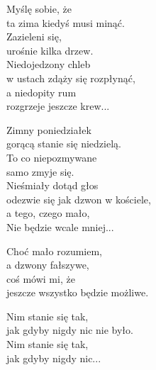 \begin{text}
    Myślę sobie, że\\
    ta zima kiedyś musi minąć.\\
    Zazieleni się,\\
    urośnie kilka drzew.\\
    Niedojedzony chleb\\
    w ustach zdąży się rozpłynąć,\\
    a niedopity rum\\
    rozgrzeje jeszcze krew...

    Zimny poniedziałek\\
    gorącą stanie się niedzielą.\\
    To co niepozmywane\\
    samo zmyje się.\\
    Nieśmiały dotąd głos\\
    odezwie się jak dzwon w kościele,\\
    a tego, czego mało,\\
    Nie będzie wcale mniej...

    Choć mało rozumiem,\\
    a dzwony fałszywe,\\
    coś mówi mi, że\\
    jeszcze wszystko będzie możliwe.

    Nim stanie się tak,\\
    jak gdyby nigdy nic nie było.\\
    Nim stanie się tak,\\
    jak gdyby nigdy nic...
\end{text}
\begin{chord}

\end{chord}